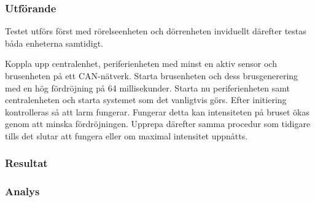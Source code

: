 \subsubsection*{Utförande}
Testet utförs först med rörelseenheten och dörrenheten inviduellt därefter testas båda enheterna samtidigt.

Koppla upp centralenhet, periferienheten med minst en aktiv sensor och brusenheten på ett CAN-nätverk. Starta brusenheten och dess brusgenerering med en hög fördröjning på 64 millisekunder. Starta nu periferienheten samt centralenheten och starta systemet som det vanligtvis görs. Efter initiering kontrolleras så att larm fungerar. Fungerar detta kan intensiteten på bruset ökas genom att minska fördröjningen. Upprepa därefter samma procedur som tidigare tills det slutar att fungera eller om maximal intensitet uppnåtts.


\subsubsection*{Resultat}



\subsubsection*{Analys}



